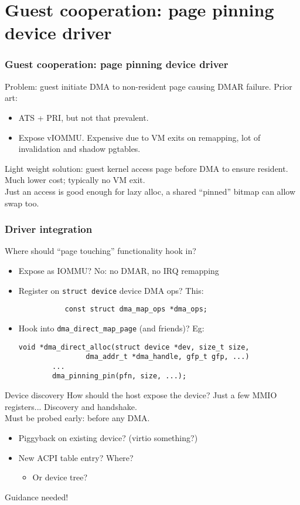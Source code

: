 \documentclass{beamer}
\begin{document}
\section{Guest cooperation: page pinning device driver}
\begin{frame}[fragile]
  \frametitle{Guest cooperation: page pinning device driver}
  Problem: guest initiate DMA to non-resident page causing DMAR failure.
  Prior art:
  \begin{itemize}
    \item ATS + PRI, but not that prevalent.
    \item Expose vIOMMU. Expensive due to VM exits on remapping, lot of invalidation and shadow pgtables.
  \end{itemize}
   Light weight solution: guest kernel access page before DMA to ensure resident. Much lower cost; typically no VM exit.\\

  Just an access is good enough for lazy alloc, a shared ``pinned'' bitmap can allow swap too.
\end{frame}

\begin{frame}[fragile]
  \frametitle{Driver integration}
  Where should ``page touching'' functionality hook in?
  \begin{itemize}
    \item Expose as IOMMU? No: no DMAR, no IRQ remapping
    \item Register on \texttt{struct device} device DMA ops? This:
      \begin{verbatim}
           const struct dma_map_ops *dma_ops;
      \end{verbatim}
    \item Hook into \texttt{dma\_direct\_map\_page} (and friends)? Eg:\\
      \begin{verbatim}
void *dma_direct_alloc(struct device *dev, size_t size,
                dma_addr_t *dma_handle, gfp_t gfp, ...)
        ...
        dma_pinning_pin(pfn, size, ...);
      \end{verbatim}
  \end{itemize}
\end{frame}

\begin{frame}{Device discovery}
  How should the host expose the device?
  Just a few MMIO registers... Discovery and handshake.\\
  
  Must be probed early: before any DMA.\\
  \begin{itemize}
    \item Piggyback on existing device? (virtio something?)
    \item New ACPI table entry? Where?
      \begin{itemize}
        \item Or device tree?
      \end{itemize}
  \end{itemize}
  Guidance needed!
\end{frame}
\end{document}
